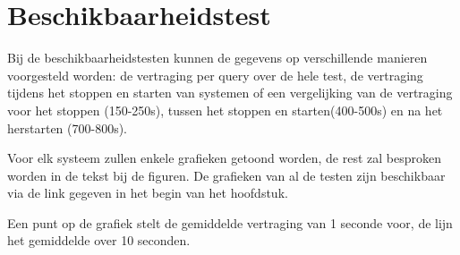 \FloatBarrier 
\section{Beschikbaarheidstest}
Bij de beschikbaarheidstesten kunnen de gegevens op verschillende manieren voorgesteld worden: de vertraging per query over de hele test, de vertraging tijdens het stoppen en starten van systemen of een vergelijking van de vertraging voor het stoppen (150-250s), tussen het stoppen en starten(400-500s) en na het herstarten (700-800s). 

Voor elk systeem zullen enkele grafieken getoond worden, de rest zal besproken worden in de tekst bij de figuren. De grafieken van al de testen zijn beschikbaar via de link gegeven in het begin van het hoofdstuk. 

Een punt op de grafiek stelt de gemiddelde vertraging van 1 seconde voor, de lijn het gemiddelde over 10 seconden. 


